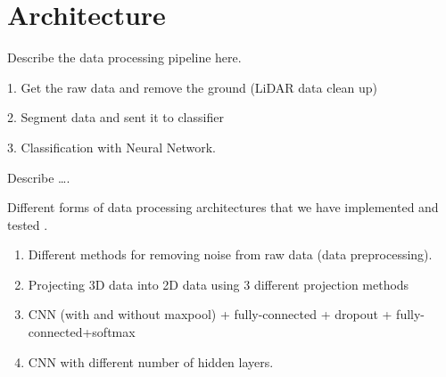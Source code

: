 \section{Architecture}


Describe the data processing pipeline here. 


1. Get the raw data and remove the ground (LiDAR data clean up)

2. Segment data and sent it to classifier 

3. Classification with Neural Network. 



Describe \ldots. 

Different forms of data processing architectures that we have implemented and tested . 

\begin{enumerate}
  \item Different methods for removing noise from raw data (data preprocessing). 
  \item Projecting 3D data into 2D data using 3 different projection methods 
  \item CNN  (with and without maxpool) + fully-connected + dropout + fully-connected+softmax
  \item CNN with different number of hidden layers. 

\end{enumerate}